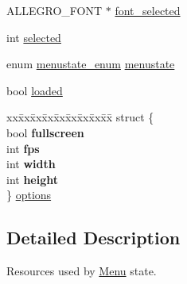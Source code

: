 \begin{DoxyCompactItemize}
A\-L\-L\-E\-G\-R\-O\-\_\-\-F\-O\-N\-T $\ast$ \hyperlink{structMenu_a577ad17dfddafaae41dde63ca7970003}{font\-\_\-selected}
\item 
int \hyperlink{structMenu_a608e2768a5458057048bf1c7ab9a81aa}{selected}
\item 
enum \hyperlink{main_8h_a5b988954c565e5ff444d61085e367fae}{menustate\-\_\-enum} \hyperlink{structMenu_a6c264952ac073cf2f290de86a677c876}{menustate}
\item 
bool \hyperlink{structMenu_afd245b822f2805677609fc0f78ee59ac}{loaded}
\item 
\begin{tabbing}
xx\=xx\=xx\=xx\=xx\=xx\=xx\=xx\=xx\=\kill
struct \{\\
\>bool {\bfseries fullscreen}\\
\>int {\bfseries fps}\\
\>int {\bfseries width}\\
\>int {\bfseries height}\\
\} \hyperlink{structMenu_aaacb604a274394a6000f437a081b13df}{options}\\

\end{tabbing}\end{DoxyCompactItemize}


\subsection{Detailed Description}
Resources used by \hyperlink{structMenu}{Menu} state. 

